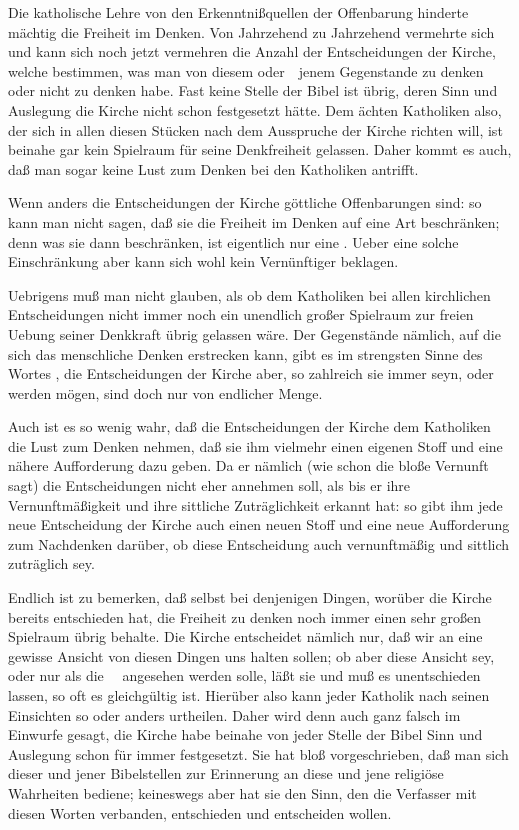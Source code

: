  Die katholische Lehre von den Erkenntnißquellen der Offenbarung hinderte mächtig die Freiheit im Denken. Von Jahrzehend zu Jahrzehend vermehrte sich und kann sich noch jetzt vermehren die Anzahl der Entscheidungen der Kirche, welche bestimmen, was man von diesem oder~\ jenem Gegenstande zu denken oder nicht zu denken habe. Fast keine Stelle der Bibel ist übrig, deren Sinn und Auslegung die Kirche nicht schon festgesetzt hätte. Dem ächten Katholiken also, der sich in allen diesen Stücken nach dem Ausspruche der Kirche richten will, ist beinahe gar kein Spielraum für seine Denkfreiheit gelassen. Daher kommt es auch, daß man sogar keine Lust zum Denken bei den Katholiken antrifft.\par
{}
\begin{aufza}
\item Wenn anders die Entscheidungen der Kirche göttliche Offenbarungen sind: so kann man nicht sagen, daß sie die Freiheit im Denken auf eine  Art beschränken; denn was sie dann beschränken, ist eigentlich nur eine . Ueber eine solche Einschränkung aber kann sich wohl kein Vernünftiger beklagen.
\item Uebrigens muß man nicht glauben, als ob dem Katholiken bei allen kirchlichen Entscheidungen nicht immer noch ein unendlich großer Spielraum zur freien Uebung seiner Denkkraft übrig gelassen wäre. Der Gegenstände nämlich, auf die sich das menschliche Denken erstrecken kann, gibt es im strengsten Sinne des Wortes , die Entscheidungen der Kirche aber, so zahlreich sie immer seyn, oder werden mögen, sind doch nur von endlicher Menge.
\item Auch ist es so wenig wahr, daß die Entscheidungen der Kirche dem Katholiken die Lust zum Denken nehmen, daß sie ihm vielmehr einen eigenen Stoff und eine nähere Aufforderung dazu geben. Da er nämlich (wie schon die bloße Vernunft sagt) die Entscheidungen nicht eher annehmen soll, als bis er ihre Vernunftmäßigkeit und ihre sittliche Zuträglichkeit erkannt hat: so gibt ihm jede neue Entscheidung der Kirche auch einen neuen Stoff und eine neue Aufforderung zum Nachdenken darüber, ob diese Entscheidung auch vernunftmäßig und sittlich zuträglich sey.
\item Endlich ist zu bemerken, daß selbst bei denjenigen Dingen, worüber die Kirche bereits entschieden hat, die Freiheit zu denken noch immer einen sehr großen Spielraum übrig behalte. Die Kirche entscheidet nämlich nur, daß wir an eine gewisse Ansicht von diesen Dingen uns halten sollen; ob aber diese Ansicht  sey, oder nur als die~\  angesehen werden solle, läßt sie und muß es unentschieden lassen, so oft es gleichgültig ist. Hierüber also kann jeder Katholik nach seinen Einsichten so oder anders urtheilen. Daher wird denn auch ganz falsch im Einwurfe gesagt, die Kirche habe beinahe von jeder Stelle der Bibel Sinn und Auslegung schon für immer festgesetzt. Sie hat bloß vorgeschrieben, daß man sich dieser und jener Bibelstellen zur Erinnerung an diese und jene religiöse Wahrheiten bediene; keineswegs aber hat sie den  Sinn, den die Verfasser mit diesen Worten verbanden, entschieden und entscheiden wollen.

\end{aufza}
